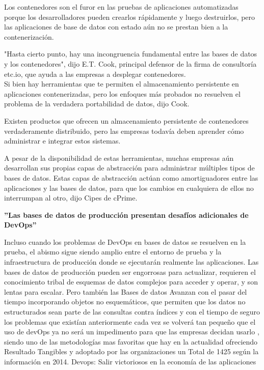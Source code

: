 \documentclass[preprint,12pt]{elsarticle}
\begin{document}
Los contenedores son el furor en las pruebas de aplicaciones automatizadas porque los desarrolladores pueden crearlos rápidamente y luego destruirlos, pero las aplicaciones de base de datos con estado aún no se prestan bien a la contenerización.

"Hasta cierto punto, hay una incongruencia fundamental entre las bases de datos y los contenedores", dijo E.T. Cook, principal defensor de la firma de consultoría etc.io, que ayuda a las empresas a desplegar contenedores. 
\\
Si bien hay herramientas que te permiten el almacenamiento persistente en aplicaciones contenerizadas, pero los enfoques más probados no resuelven el problema de la verdadera portabilidad de datos, dijo Cook.

Existen productos que ofrecen un almacenamiento persistente de contenedores verdaderamente distribuido, pero las empresas todavía deben aprender cómo administrar e integrar estos sistemas.

A pesar de la disponibilidad de estas herramientas, muchas empresas aún desarrollan sus propias capas de abstracción para administrar múltiples tipos de bases de datos. Estas capas de abstracción actúan como amortiguadores entre las aplicaciones y las bases de datos, para que los cambios en cualquiera de ellos no interrumpan al otro, dijo Cipes de cPrime.

\textbf{''Las bases de datos de producción presentan desafíos adicionales de DevOps''}

Incluso cuando los problemas de DevOps en bases de datos se resuelven en la prueba, el abismo sigue siendo amplio entre el entorno de prueba y la infraestructura de producción donde se ejecutarán realmente las aplicaciones. Las bases de datos de producción pueden ser engorrosas para actualizar, requieren el conocimiento tribal de esquemas de datos complejos para acceder y operar, y son lentas para escalar. Pero también las Bases de datos Avanzan con el pasar del tiempo incorporando objetos no esquemáticos, que permiten que los datos no estructurados sean parte de las consultas contra índices y con el tiempo de seguro los problemas que existían anteriormente cada vez se volverá tan pequeño que el uso de devOps ya no será un impedimento para que las empresas decidan usarlo , siendo uno de las metodologías mas favoritas que hay en la actualidad ofreciendo Resultado Tangibles y adoptado por las organizaciones un Total de 1425 según la información en 2014. Devops: Salir victoriosos en la economía de las aplicaciones
\end{document}
